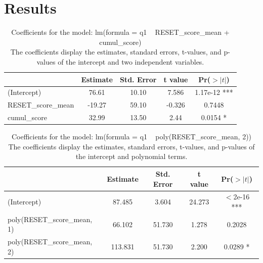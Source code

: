 \documentclass[a4paper, 11]{article}
\begin{document}
\section{Results}

\begin{table}[H]
\centering
\begin{tabular}{lcccc}
\toprule
 & Estimate & Std. Error & t value & Pr($>|t|$) \\
\midrule
(Intercept) & 76.61 & 10.10 & 7.586 & 1.17e-12 *** \\
RESET\_score\_mean & -19.27 & 59.10 & -0.326 & 0.7448 \\
cumul\_score & 32.99 & 13.50 & 2.44 & 0.0154 * \\
\bottomrule
\end{tabular}
\caption{Coefficients for the model: lm(formula = q1 ~ RESET\_score\_mean + cumul\_score) \\
The coefficients display the estimates, standard errors, t-values, and p-values of the intercept and two independent variables.}
\label{tab:model1}
\end{table}

\vspace{1\baselineskip}

\begin{table}[H]
\centering
\begin{tabular}{lcccc}
\toprule
 & Estimate & Std. Error & t value & Pr($>|t|$) \\
\midrule
(Intercept) & 87.485 & 3.604 & 24.273 & $<$2e-16 *** \\
poly(RESET\_score\_mean, 1) & 66.102 & 51.730 & 1.278 & 0.2028 \\
poly(RESET\_score\_mean, 2) & 113.831 & 51.730 & 2.200 & 0.0289 * \\
\bottomrule
\end{tabular}
\caption{   Coefficients for the model: lm(formula = q1 ~ poly(RESET\_score\_mean, 2))\\ 
The coefficients display the estimates, standard errors, t-values, and p-values of the intercept and polynomial terms.}
\label{tab:model2}
\end{table}
\end{document}
